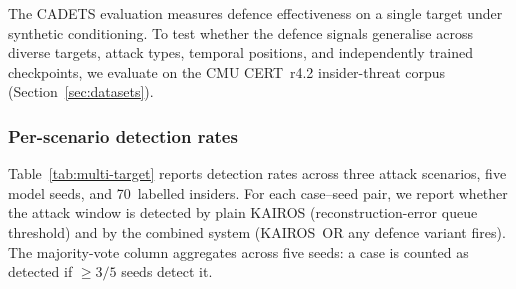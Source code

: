 \documentclass[10pt,twocolumn]{article}
\begin{document}
The CADETS evaluation measures defence effectiveness on a single target
under synthetic conditioning.  To test whether the defence signals
generalise across diverse targets, attack types, temporal positions, and
independently trained checkpoints, we evaluate on the CMU CERT~r4.2
insider-threat corpus (Section~\ref{sec:datasets}).

\subsubsection{Per-scenario detection rates}

Table~\ref{tab:multi-target} reports detection rates across three attack
scenarios, five model seeds, and 70~labelled insiders.  For each
case--seed pair, we report whether the attack window is detected by plain
KAIROS (reconstruction-error queue threshold) and by the combined system
(KAIROS~OR any defence variant fires).  The majority-vote column aggregates
across five seeds: a case is counted as detected if $\geq 3/5$ seeds
detect it.

\begin{table}[htbp]
\centering
\caption{Multi-target detection on CERT~r4.2 across 70~insiders and
5~seeds.  ``Plain'' = adapted KAIROS with q99 threshold.  ``Combined'' =
KAIROS OR defence (complementary OR gate).  Majority vote requires
$\geq 3/5$ seeds.  The defence improves Scenario~2 detection from 26/30
to 28/30 and raises the aggregate net detection rate to $+0.114$
(best seed) while preserving base-detector recall.}
\label{tab:multi-target}
\end{table}
\end{document}
